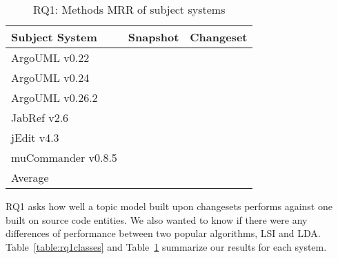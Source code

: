 \begin{table}[t]
\renewcommand{\arraystretch}{1.3}
\footnotesize
\centering
\caption{RQ1: Methods MRR of subject systems}
\begin{tabular}{lrr}
    \toprule
    Subject System      & Snapshot  & Changeset \\
    \midrule
    ArgoUML v0.22       &           &           \\
    ArgoUML v0.24       &           &           \\
    ArgoUML v0.26.2     &           &           \\
    JabRef v2.6         &           &           \\
    jEdit v4.3          &           &           \\
    muCommander v0.8.5  &           &           \\
    \midrule
    Average             &           &           \\
    \bottomrule
\end{tabular}
\label{table:rq1methods}
\end{table}


RQ1 asks how well a topic model built upon changesets performs against
one built on source code entities.
We also wanted to know if there were any differences of performance
between two popular algorithms, LSI and LDA.
Table~\ref{table:rq1classes} and Table~\ref{table:rq1methods}
summarize our results for each system.


